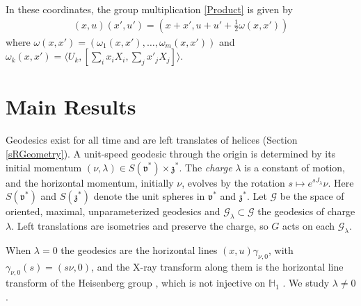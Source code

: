 \documentclass[11pt]{amsart}
\theoremstyle{plain}
\theoremstyle{definition}
\theoremstyle{remark}
\numberwithin{equation}{section}
\def\fz{\mathfrak{z}}
\def\fv{\mathfrak{v}}
\def\cG{\mathcal{G}}
\def \heis {\mathbb{H}}
\numberwithin{equation}{section}
\begin{document}
In these coordinates, the group multiplication \eqref{Product} is given by
\begin{align}
	(x, u)(x', u')=(x+x', u+u'+\tfrac{1}{2}\omega( x, x')) \label{product}
\end{align}
where $\omega(x, x')=(\omega_1(x, x'), \ldots, \omega_m(x, x'))$ and $\omega_k(x, x')=\langle U_k, [\sum_i x_iX_i, \sum_j x'_jX_j]\rangle$.


 


\section{Main Results}\label{MainResults}
Geodesics exist for all time and are left translates of helices (Section \ref{sRGeometry}). A unit-speed geodesic through the origin is determined by its initial momentum $(\nu, \lambda)\in S(\fv^*)\times\fz^*$. The \textit{charge} $\lambda$ is a constant of motion, and the horizontal momentum, initially $\nu$, evolves by the rotation $s\mapsto e^{sJ_\lambda}\nu$. Here $S(\fv^*)$ and $S(\fz^*)$ denote the unit spheres in $\fv^*$ and $\fz^*$. Let $\cG$ be the space of oriented, maximal, unparameterized geodesics and $\cG_\lambda\subset\cG$ the geodesics of charge $\lambda$. Left translations are isometries and preserve the charge, so $G$ acts on each $\cG_\lambda$.

When $\lambda=0$ the geodesics are the horizontal lines $(x, u)\gamma_{\nu, 0}$, with $\gamma_{\nu, 0}(s)=(s\nu, 0)$, and the X-ray transform along them is the horizontal line transform of the Heisenberg group \cite{strichartzLpHarmonicAnalysis1991, xiaoKplaneTransformHeisenberg2020}, which is not injective on $\heis_1$ \cite{strichartzLpHarmonicAnalysis1991}. We study $\lambda\neq 0$.
\end{document}
